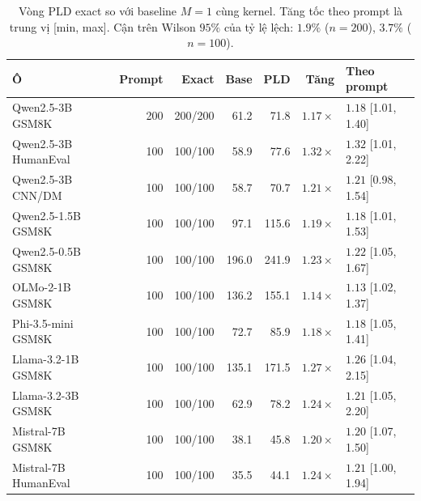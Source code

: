 \begin{table}[t]
\centering\small
\caption{Vòng PLD exact so với baseline $M{=}1$ cùng kernel. Tăng tốc theo prompt là trung vị [min, max]. Cận trên Wilson $95\%$ của tỷ lệ lệch: $1.9\%$ ($n{=}200$), $3.7\%$ ($n{=}100$).}\label{tab:k-speed}
\begin{tabular}{@{}lrrrrrl@{}}
\toprule
Ô & Prompt & Exact & Base & PLD & Tăng & Theo prompt\\\midrule
Qwen2.5-3B GSM8K & 200 & 200/200 & 61.2 & 71.8 & $1.17\times$ & $1.18$ [1.01, 1.40]\\
Qwen2.5-3B HumanEval & 100 & 100/100 & 58.9 & 77.6 & $1.32\times$ & $1.32$ [1.01, 2.22]\\
Qwen2.5-3B CNN/DM & 100 & 100/100 & 58.7 & 70.7 & $1.21\times$ & $1.21$ [0.98, 1.54]\\
Qwen2.5-1.5B GSM8K & 100 & 100/100 & 97.1 & 115.6 & $1.19\times$ & $1.18$ [1.01, 1.53]\\
Qwen2.5-0.5B GSM8K & 100 & 100/100 & 196.0 & 241.9 & $1.23\times$ & $1.22$ [1.05, 1.67]\\
OLMo-2-1B GSM8K & 100 & 100/100 & 136.2 & 155.1 & $1.14\times$ & $1.13$ [1.02, 1.37]\\
Phi-3.5-mini GSM8K & 100 & 100/100 & 72.7 & 85.9 & $1.18\times$ & $1.18$ [1.05, 1.41]\\
Llama-3.2-1B GSM8K & 100 & 100/100 & 135.1 & 171.5 & $1.27\times$ & $1.26$ [1.04, 2.15]\\
Llama-3.2-3B GSM8K & 100 & 100/100 & 62.9 & 78.2 & $1.24\times$ & $1.21$ [1.05, 2.20]\\
Mistral-7B GSM8K & 100 & 100/100 & 38.1 & 45.8 & $1.20\times$ & $1.20$ [1.07, 1.50]\\
Mistral-7B HumanEval & 100 & 100/100 & 35.5 & 44.1 & $1.24\times$ & $1.21$ [1.00, 1.94]\\
\bottomrule
\end{tabular}
\end{table}

